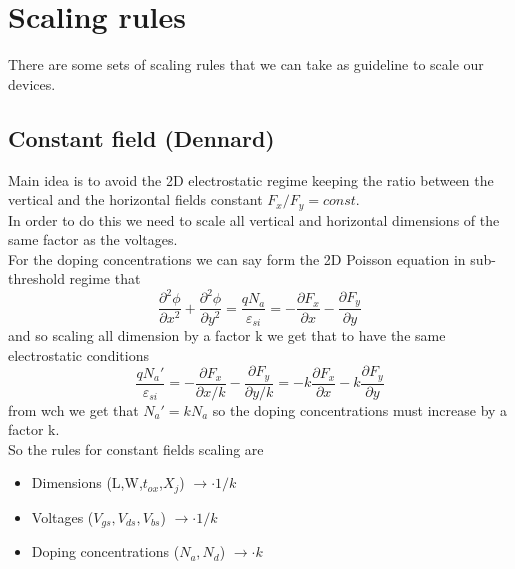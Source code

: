 \section{Scaling rules}
There are some sets of scaling rules that we can take as guideline to scale our devices.

\subsection{Constant field (Dennard)}
Main idea is to avoid the 2D electrostatic regime keeping the ratio between the vertical and the horizontal fields constant $F_x/F_y=const.$\\
In order to do this we need to scale all vertical and horizontal dimensions of the same factor as the voltages.\\ 
For the doping concentrations we can say form the 2D Poisson equation in sub-threshold regime that 
\begin{equation}
\frac{\partial^2 \phi}{\partial x^2}+\frac{\partial^2 \phi}{\partial y^2}=\frac{qN_a}{\varepsilon_{si}}=-\frac{\partial F_x}{\partial x}-\frac{\partial F_y}{\partial y}
\end{equation}
and so scaling all dimension by a factor k we get that to have the same electrostatic conditions
\begin{equation}
\frac{qN_a'}{\varepsilon_{si}}=-\frac{\partial F_x}{\partial x/k}-\frac{\partial F_y}{\partial y/k}=-k\frac{\partial F_x}{\partial x}-k\frac{\partial F_y}{\partial y}
\end{equation}
from wch we get that $N_a'=kN_a$ so the doping concentrations must increase by a factor k.\\
So the rules for constant fields scaling are 
\begin{itemize}
  \item Dimensions (L,W,$t_{ox}$,$X_j$)     $\rightarrow \cdot 1/k$
  \item Voltages ($V_{gs},V_{ds},V_{bs}$)   $\rightarrow \cdot 1/k$
  \item Doping concentrations ($N_a,N_d$)   $\rightarrow \cdot k$
\end{itemize}

